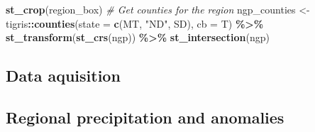 \documentclass[
]{article}
\newenvironment{Shaded}{\begin{snugshade}}{\end{snugshade}}
\newcommand{\AttributeTok}[1]{\textcolor[rgb]{0.13,0.29,0.53}{#1}}
\newcommand{\CommentTok}[1]{\textcolor[rgb]{0.56,0.35,0.01}{\textit{#1}}}
\newcommand{\FunctionTok}[1]{\textcolor[rgb]{0.13,0.29,0.53}{\textbf{#1}}}
\newcommand{\NormalTok}[1]{#1}
\newcommand{\OtherTok}[1]{\textcolor[rgb]{0.56,0.35,0.01}{#1}}
\newcommand{\SpecialCharTok}[1]{\textcolor[rgb]{0.81,0.36,0.00}{\textbf{#1}}}
\newcommand{\StringTok}[1]{\textcolor[rgb]{0.31,0.60,0.02}{#1}}
\begin{document}
\begin{Shaded}
\begin{Highlighting}[]
     \FunctionTok{st\_crop}\NormalTok{(region\_box)}
\CommentTok{\# Get counties for the region}
\NormalTok{  ngp\_counties }\OtherTok{\textless{}{-}} 
\NormalTok{    tigris}\SpecialCharTok{::}\FunctionTok{counties}\NormalTok{(}\AttributeTok{state =} \FunctionTok{c}\NormalTok{(}\StringTok{\textquotesingle{}MT\textquotesingle{}}\NormalTok{, }\StringTok{"ND"}\NormalTok{, }\StringTok{\textquotesingle{}SD\textquotesingle{}}\NormalTok{), }\AttributeTok{cb =}\NormalTok{ T) }\SpecialCharTok{\%\textgreater{}\%}
    \FunctionTok{st\_transform}\NormalTok{(}\FunctionTok{st\_crs}\NormalTok{(ngp)) }\SpecialCharTok{\%\textgreater{}\%} 
    \FunctionTok{st\_intersection}\NormalTok{(ngp)}
\end{Highlighting}
\end{Shaded}

\subsection{Data aquisition}\label{data-aquisition}

\subsection{Regional precipitation and
anomalies}\label{regional-precipitation-and-anomalies}
\end{document}
